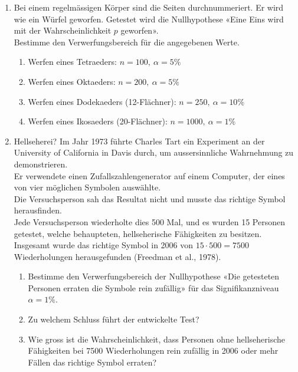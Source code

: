 \clearpage
\begin{ueb}
    {}{}
    \begin{enumerate}
        \item Bei einem regelmässigen Körper sind die Seiten durchnummeriert. Er wird wie ein Würfel geworfen. Getestet wird die Nullhypothese «Eine Eins wird mit der Wahrscheinlichkeit \( p \) geworfen». \\
              Bestimme den Verwerfungsbereich für die angegebenen Werte.
              \begin{enumerate}
                  \item Werfen eines Tetraeders: \( n = 100, \ \alpha = 5\% \)
                  \item Werfen eines Oktaeders: \( n = 200, \ \alpha = 5\% \)
                  \item Werfen eines Dodekaeders (12-Flächner): \( n = 250, \ \alpha = 10\% \)
                  \item Werfen eines Ikosaeders (20-Flächner): \( n = 1000, \ \alpha = 1\% \)
              \end{enumerate}

        \item Hellseherei? Im Jahr 1973 führte Charles Tart ein Experiment an der University of California in Davis durch, um aussersinnliche Wahrnehmung zu demonstrieren. \\
              Er verwendete einen Zufallszahlengenerator auf einem Computer, der eines von vier möglichen Symbolen auswählte. \\
              Die Versuchsperson sah das Resultat nicht und musste das richtige Symbol herausfinden. \\
              Jede Versuchsperson wiederholte dies 500 Mal, und es wurden 15 Personen getestet, welche behaupteten, hellseherische Fähigkeiten zu besitzen. \\
              Insgesamt wurde das richtige Symbol in 2006 von \( 15 \cdot 500 = 7500 \) Wiederholungen herausgefunden (Freedman et al., 1978).

              \begin{enumerate}
                  \item Bestimme den Verwerfungsbereich der Nullhypothese «Die getesteten Personen erraten die Symbole rein zufällig» für das Signifikanzniveau \( \alpha = 1\% \).

                  \item Zu welchem Schluss führt der entwickelte Test?

                  \item Wie gross ist die Wahrscheinlichkeit, dass Personen ohne hellseherische Fähigkeiten bei 7500 Wiederholungen rein zufällig in 2006 oder mehr Fällen das richtige Symbol erraten?
              \end{enumerate}
    \end{enumerate}

\end{ueb}

